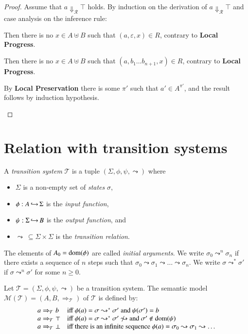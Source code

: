 \documentclass[a4paper,draft,preprint,sort&compress]{elsarticle}
\newcommand{\M}{\ensuremath{\mathcal{M}}}
\newcommand{\R}{\ensuremath{\mathcal{R}}}
\newcommand{\T}{\ensuremath{\mathcal{T}}}
\begin{document}
\begin{proof}
  Assume that $a \Downarrow_\R \top$ holds. By induction on the derivation of $a \Downarrow_\R \top$ and
  case analysis on the inference rule:
  \begin{description}[font=\sc,labelindent=\parindent,style=nextline]
  \item[(Err-1)]

    Then there is no \mbox{$x \in A \uplus B$} such that \mbox{$(a,\varepsilon,x) \in R$},
    contrary to \textbf{Local Progress}.

  \item[(Err-2)]

    Then there is no \mbox{$x \in A \uplus B$} such that \mbox{$(a,b_1 \ldots b_{n+1},x) \in R$},
    contrary to \textbf{Local Progress}.

  \item[(Err-3)]

    By \textbf{Local Preservation} there is some $\pi'$ such that $a' \in A^{\pi'}$, and the result
    follows by induction hypothesis.
    
  \end{description}
\end{proof}


\section{Relation with transition systems}
\label{sec:Relation_with_transition_systems}


A \emph{transition system} $\T$ is a tuple $(\Sigma, \phi, \psi, \leadsto)$ where
\begin{itemize}
\item $\Sigma$ is a non-empty set of \emph{states} $\sigma$,
\item $\phi: A \operatorname{\hookrightarrow} \Sigma$ is the \emph{input function},
\item $\psi: \Sigma \operatorname{\hookrightarrow} B$ is the \emph{output function}, and
\item $\leadsto~\subseteq \Sigma \times \Sigma$ is the \emph{transition relation}.
\end{itemize}
The elements of $A_0 = \operatorname{dom}(\phi)$ are called \emph{initial arguments}.
We write \mbox{$\sigma_0 \leadsto^n \sigma_n$} if there exists a sequence of $n$ steps
such that \mbox{$\sigma_0 \leadsto \sigma_1 \leadsto \ldots \leadsto \sigma_n$}. We
write \mbox{$\sigma \leadsto^* \sigma'$} if \mbox{$\sigma \leadsto^n \sigma'$} for some
\mbox{$n \ge 0$}.

Let $\T = (\Sigma,\phi,\psi,\leadsto)$ be a transition system. The semantic model
\mbox{$\M(\T) = (A,B,\Rightarrow_\T)$} of $\T$ is defined by:
\[\begin{array}{ll}
  a \Rightarrow_\T b
  & \mbox{iff $\phi(a) = \sigma \leadsto^* \sigma'$ and $\psi(\sigma') = b$} \\
  a \Rightarrow_\T \top
  & \mbox{iff $\phi(a) = \sigma \leadsto^* \sigma' \not\leadsto$ and $\sigma' \not\in\dom(\psi)$} \\
  a \Rightarrow_\T \bot
  & \mbox{iff there is an infinite sequence $\phi(a) = \sigma_0 \leadsto \sigma_1 \leadsto \ldots$} \\
\end{array}\]
\end{document}
